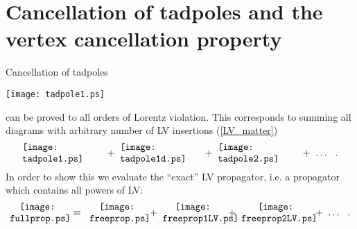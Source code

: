 \documentclass[a4paper,12pt]{article}
\begin{document}
\section{Cancellation of tadpoles and 
 	the vertex cancellation property}
\label{app_cancellation}

	Cancellation of tadpoles 
\begin{center}
\texttt{[image: tadpole1.ps]}
\end{center}
	can be proved to all orders of Lorentz violation.
	This corresponds to summing all diagrams with arbitrary
	number of LV insertions (\ref{LV_matter})
\begin{equation}
\label{full_tadpole}
	\begin{minipage}[c]{3.0cm}
	\texttt{[image: tadpole1.ps]} 
	\end{minipage}
	   +~
	\begin{minipage}[c]{3.0cm}
	\texttt{[image: tadpole1d.ps]} 
	\end{minipage}
	   +~
	\begin{minipage}[c]{3.0cm}
	\texttt{[image: tadpole2.ps]} 
	\end{minipage}
	   +~
	   \ldots
	   ~~.
\end{equation}
	In order to show this we evaluate the ``exact'' LV 
	propagator, i.e. a propagator which contains all powers
	of LV:
\begin{equation}
\label{def_full_prop}
\begin{minipage}[c]{2.0cm}
\centering
\texttt{[image: fullprop.ps]} 
\end{minipage}
    \;~\equiv~\;
\begin{minipage}[c]{2.0cm}
\centering
\texttt{[image: freeprop.ps]} 
\end{minipage}
    ~+~
\begin{minipage}[c]{2.2cm}
\centering
\texttt{[image: freeprop1LV.ps]} 
\end{minipage}
    ~+~
\begin{minipage}[c]{2.5cm}
\centering
\texttt{[image: freeprop2LV.ps]} 
\end{minipage}
    ~+~
    \ldots
    ~~.
\end{equation}
\end{document}
